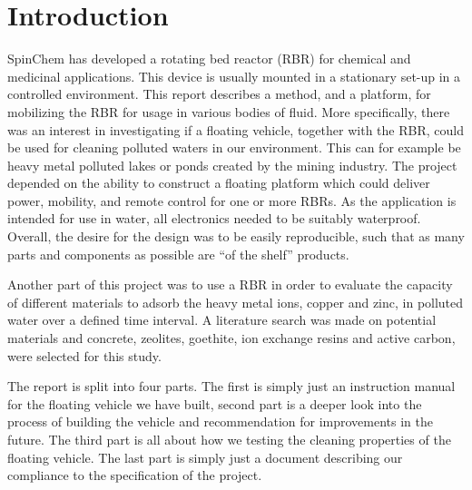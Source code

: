 \section{Introduction}

SpinChem\textsuperscript{\textregistered} has developed a rotating bed reactor (RBR) for chemical and medicinal
applications. This device is usually mounted in a stationary set-up in a
controlled environment. This report describes a method, and a platform, for
mobilizing the RBR for usage in various bodies of fluid. More specifically,
there was an interest in investigating if a floating vehicle, together with the RBR,
could be used for cleaning polluted waters in our environment. This can for example be heavy metal
polluted lakes or ponds created by the mining industry. The project depended on
the ability to construct a floating platform which could deliver power,
mobility, and remote control for one or more RBRs. As the application is intended for
use in water, all electronics needed to be suitably waterproof. Overall, the
desire for the design was to be easily reproducible, such that as many parts and components as
possible are ``of the shelf'' products.

Another part of this project was to use a RBR in order to evaluate the capacity of different materials to adsorb the heavy metal ions, copper and zinc, in polluted water over a defined time interval. A literature search was made on potential materials and concrete, zeolites, goethite, ion exchange resins and active carbon, were selected for this study.

The report is split into four parts. The first is simply just an instruction manual for the floating vehicle we have built, second part is a deeper look into the process of building the vehicle and recommendation for improvements in the future. The third part is all about how we testing the cleaning properties of the floating vehicle. The last part is simply just a document describing our compliance to the specification of the project. 
